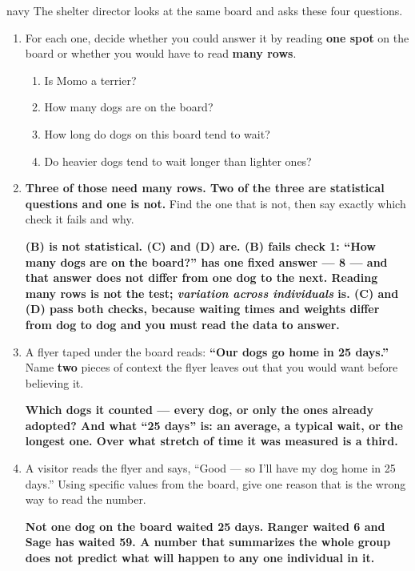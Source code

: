 \documentclass[10pt]{article}
\newcommand{\answerspace}[2]{\par\nopagebreak\noindent\begin{minipage}[t][#1][t]{\linewidth}%
  \color{keyred}\bfseries #2\end{minipage}\par}
\begin{document}
\boxguard[26]
\begin{scenariobox}{navy}
\small
The shelter director looks at the same board and asks these four questions.

\vspace{4pt}
\begin{enumerate}[label=\textbf{\alph*.}, leftmargin=1.8em, itemsep=7pt]
  \item For each one, decide whether you could answer it by reading \textbf{one spot} on the
        board or whether you would have to read \textbf{many rows}.

        \begin{enumerate}[label=\textbf{(\Alph*)}, leftmargin=2.2em, itemsep=4pt]
          \item Is Momo a terrier? \hfill {}
          \item How many dogs are on the board? \hfill {}
          \item How long do dogs on this board tend to wait? \hfill {}
          \item Do heavier dogs tend to wait longer than lighter ones? \hfill {}
        \end{enumerate}
  \item \textbf{Three of those need many rows. Two of the three are statistical questions and
        one is not.} Find the one that is not, then say exactly which check it fails and why.
        \answerspace{2.4cm}{\textbf{(B)} is not statistical. (C) and (D) are. (B) fails
        \textbf{check 1}: ``How many dogs are on the board?'' has one fixed answer --- 8 ---
        and that answer does not differ from one dog to the next. Reading many rows is not the
        test; \emph{variation across individuals} is. (C) and (D) pass both checks, because
        waiting times and weights differ from dog to dog and you must read the data to answer.}
  \item A flyer taped under the board reads: \textbf{``Our dogs go home in 25 days.''}
        Name \textbf{two} pieces of context the flyer leaves out that you would want before
        believing it.
        \answerspace{1.8cm}{Which dogs it counted --- every dog, or only the ones already
        adopted? And what ``25 days'' is: an average, a typical wait, or the longest one. Over
        what stretch of time it was measured is a third.}
  \item A visitor reads the flyer and says, ``Good --- so I'll have my dog home in 25 days.''
        Using specific values from the board, give one reason that is the wrong way to read
        the number.
        \answerspace{1.8cm}{Not one dog on the board waited 25 days. Ranger waited 6 and Sage
        has waited 59. A number that summarizes the whole group does not predict what will
        happen to any one individual in it.}
\end{enumerate}
\end{scenariobox}
\end{document}
